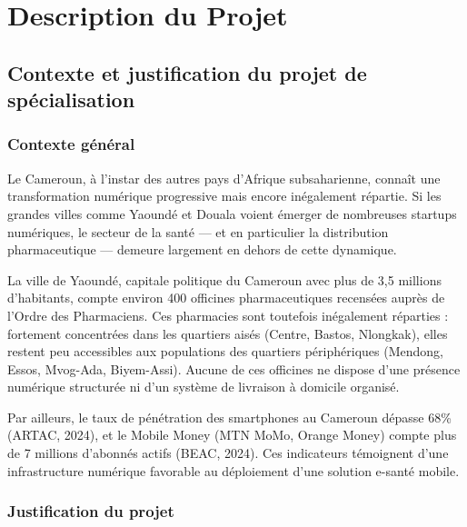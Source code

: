 \documentclass[12pt,a4paper,oneside]{report}
\begin{document}
\setcounter{page}{1}

\chapter{Description du Projet}

\section{Contexte et justification du projet de spécialisation}

\subsection{Contexte général}

Le Cameroun, à l'instar des autres pays d'Afrique subsaharienne, connaît une transformation numérique progressive mais encore inégalement répartie. Si les grandes villes comme Yaoundé et Douala voient émerger de nombreuses startups numériques, le secteur de la santé — et en particulier la distribution pharmaceutique — demeure largement en dehors de cette dynamique.

La ville de Yaoundé, capitale politique du Cameroun avec plus de 3,5 millions d'habitants, compte environ 400 officines pharmaceutiques recensées auprès de l'Ordre des Pharmaciens. Ces pharmacies sont toutefois inégalement réparties : fortement concentrées dans les quartiers aisés (Centre, Bastos, Nlongkak), elles restent peu accessibles aux populations des quartiers périphériques (Mendong, Essos, Mvog-Ada, Biyem-Assi). Aucune de ces officines ne dispose d'une présence numérique structurée ni d'un système de livraison à domicile organisé.

Par ailleurs, le taux de pénétration des smartphones au Cameroun dépasse 68\% (ARTAC, 2024), et le Mobile Money (MTN MoMo, Orange Money) compte plus de 7 millions d'abonnés actifs (BEAC, 2024). Ces indicateurs témoignent d'une infrastructure numérique favorable au déploiement d'une solution e-santé mobile.

\subsection{Justification du projet}
\end{document}
